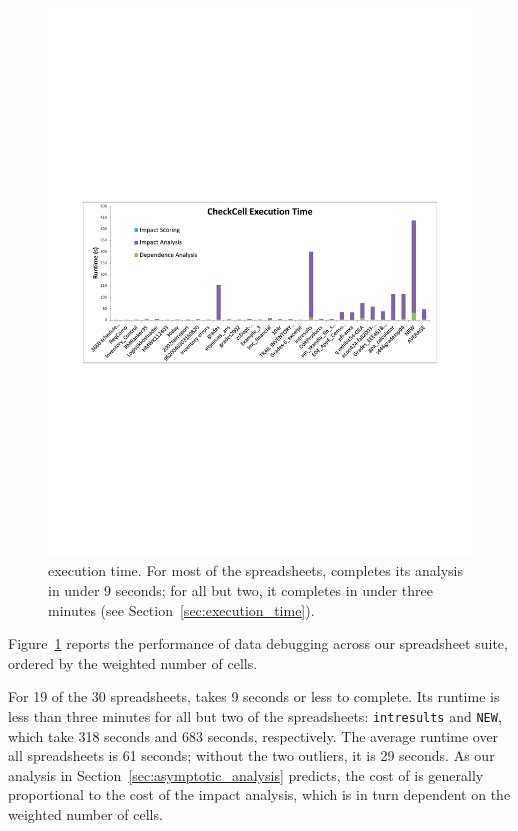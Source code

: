 \begin{figure}[!t]
\centering
\includegraphics[width=5in]{execution_time_graph}
  \caption{\checkcell{} execution time. For most of the spreadsheets, \checkcell{} completes its analysis in under 9 seconds; for all but two, it completes in under three minutes (see Section~\ref{sec:execution_time}).\label{fig:execution_time_graph}}
\end{figure}
 
Figure~\ref{fig:execution_time_graph} reports the performance of data
debugging across our spreadsheet suite, ordered by the weighted number
of cells.

For 19 of the 30 spreadsheets, \checkcell{} takes 9 seconds or less to
complete. Its runtime is less than three minutes for all but two of
the spreadsheets: \texttt{intresults} and \texttt{NEW}, which take 318
seconds and 683 seconds, respectively. The average runtime over all
spreadsheets is 61 seconds; without the two outliers, it is 29
seconds. As our analysis in Section~\ref{sec:asymptotic_analysis}
predicts, the cost of \checkcell{} is generally proportional to the
cost of the impact analysis, which is in turn dependent on the
weighted number of cells.


